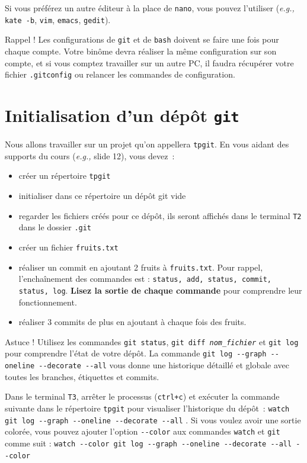 \documentclass[final, a4paper, openbib, ]{article}
\begin{document}
Si vous préférez un autre éditeur à la place de \texttt{nano}, vous pouvez l'utiliser (\textit{e.g.,} \texttt{kate -b}, \texttt{vim}, \texttt{emacs}, \texttt{gedit}).

\begin{alertinfo}{Rappel !}
Les configurations de \texttt{git} et de \texttt{bash} doivent se faire une fois pour chaque compte.
Votre binôme devra réaliser la même configuration sur son compte, et si vous comptez travailler sur un autre PC, il faudra récupérer votre fichier \texttt{.gitconfig} ou relancer les commandes de configuration.
\end{alertinfo}

\section{Initialisation d'un dépôt \texttt{git}}

Nous allons travailler sur un projet qu'on appellera \texttt{tpgit}.
En vous aidant des supports du cours (\textit{e.g.,} slide 12), vous devez~:
\begin{itemize}
\item créer un répertoire \texttt{tpgit}
\item initialiser dans ce répertoire un dépôt git vide
\item regarder les fichiers créés pour ce dépôt, ils seront affichés dans le terminal \texttt{T2} dans le dossier \texttt{.git}
\item créer un fichier \texttt{fruits.txt}
\item réaliser un commit en ajoutant 2 fruits à \texttt{fruits.txt}.
Pour rappel, l'enchaînement des commandes est : \texttt{status, add, status, commit, status, log}.
\textbf{Lisez la sortie de chaque commande} pour comprendre leur fonctionnement.
\item réaliser 3 commits de plus en ajoutant à chaque fois des fruits.
\end{itemize}

\begin{alertinfo3}{Astuce !}
Utilisez les commandes \texttt{git status}, \texttt{git diff \textit{nom\_fichier}} et \texttt{git log} pour comprendre l'état de votre dépôt. La commande \texttt{git log -}\texttt{-graph -}\texttt{-oneline -}\texttt{-decorate -}\texttt{-all} vous donne une historique détaillé et globale avec toutes les branches, étiquettes et commits.
\end{alertinfo3}

Dans le terminal \texttt{T3}, arrêter le processus (\texttt{ctrl+c}) et exécuter la commande suivante dans le répertoire \texttt{tpgit} pour visualiser l'historique du dépôt~: \verb+watch git log --graph --oneline --decorate --all+ . Si vous voulez avoir une sortie colorée, vous pouvez ajouter l'option \verb+--color+ aux commandes \texttt{watch} et \texttt{git} comme suit : \verb+watch --color git log --graph --oneline --decorate --all --color+
\end{document}
